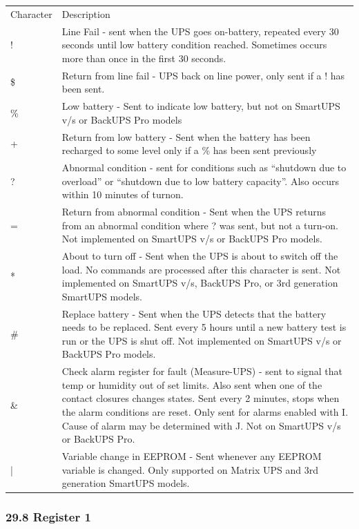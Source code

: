 {{{{{{{{{{{{{{{{{
\begin{longtable}{p{0.7in}p{4.3in}}
{Character} & {Description 
 } \\
{!} & {Line Fail - sent when the UPS goes on-battery, repeated every 30
seconds until low battery condition reached. Sometimes occurs more than once
in the first 30 seconds. 
 } \\
{\$} & {Return from line fail - UPS back on line power, only sent if a ! has
been sent. 
 } \\
{\%} & {Low battery - Sent to indicate low battery, but not on SmartUPS v/s or
BackUPS Pro models 
 } \\
{+} & {Return from low battery - Sent when the battery has been recharged to
some level only if a \% has been sent previously 
 } \\
{?} & {Abnormal condition - sent for conditions such as ``shutdown due to
overload'' or ``shutdown due to low battery capacity''. Also occurs within 10
minutes of turnon. 
 } \\
{=} & {Return from abnormal condition - Sent when the UPS returns from an
abnormal condition where ? was sent, but not a turn-on. Not implemented on
SmartUPS v/s or BackUPS Pro models. 
 } \\
{*} & {About to turn off - Sent when the UPS is about to switch off the load.
No commands are processed after this character is sent. Not implemented on
SmartUPS v/s, BackUPS Pro, or 3rd generation SmartUPS models. 
 } \\
{\#} & {Replace battery - Sent when the UPS detects that the battery needs to
be replaced. Sent every 5 hours until a new battery test is run or the UPS is
shut off. Not implemented on SmartUPS v/s or BackUPS Pro models. 
 } \\
{\&} & {Check alarm register for fault (Measure-UPS) - sent to signal that
temp or humidity out of set limits. Also sent when one of the contact closures
changes states. Sent every 2 minutes, stops when the alarm conditions are
reset. Only sent for alarms enabled with I. Cause of alarm may be determined
with J. Not on SmartUPS v/s or BackUPS Pro. 
 } \\
{|} & {Variable change in EEPROM - Sent whenever any EEPROM variable is
changed. Only supported on Matrix UPS and 3rd generation SmartUPS models.  
}

\end{longtable}

\label{Register-1}

\subsubsection*{29.8 Register 1}

}}}}}}}}}}}}}}}}}
